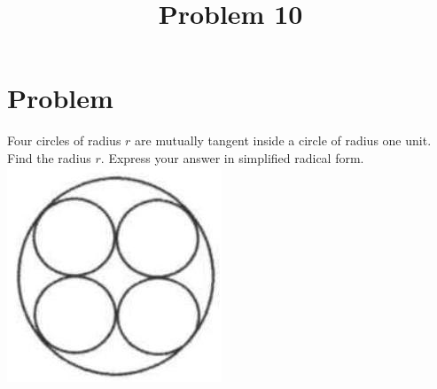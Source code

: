 \documentclass{article}
\title{Problem 10}
\date{}
\begin{document}
\maketitle

\section*{Problem}
Four circles of radius \(r\) are mutually tangent inside a circle of radius one unit. Find the radius \(r\). Express your answer in simplified radical form.\\
\centering
\includegraphics[width=\textwidth]{images/186.jpg}
\end{document}
